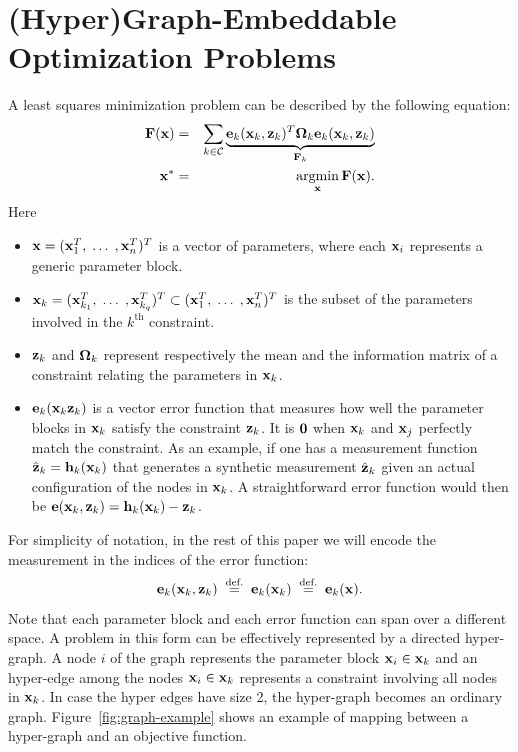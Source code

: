 \documentclass[a4paper]{article}
\begin{document}
\section{(Hyper)Graph-Embeddable Optimization Problems}
A least squares minimization problem can be described by the following equation:
\begin{eqnarray}
\mathbf{F}(\mathbf{x})&=& \sum_{k \in\mathcal{C}}
\underbrace{\mathbf{e}_k(\mathbf{x}_k, \mathbf{z}_{k})^T \mathbf{\Omega}_{k} \mathbf{e}_k(\mathbf{x}_k, \mathbf{z}_{k})}_{\mathbf{F}_{k}}
\label{eq:sumOfFactors}\\
\mathbf{x}^*&=&\mathop{\rm argmin}_{\mathbf{x}} \mathbf{F}(\mathbf{x}).
\label{eq:toMinimize}
\end{eqnarray}
Here
\begin{itemize}
  \item  $\mathbf{x}=(\mathbf{x}_1^T,\;\ldots\;,\mathbf{x}_n^T)^T$ is a vector of
    parameters, where each $\mathbf{x}_i$ represents a generic parameter block.
  \item $\mathbf{x}_k=(\mathbf{x}_{k_1}^T,\;\ldots\;,\mathbf{x}_{k_q}^T)^T \subset
    (\mathbf{x}_1^T,\;\ldots\;,\mathbf{x}_n^T)^T$ is the subset of the parameters
    involved in the $k^\mathrm{th}$ constraint.
  \item $\mathbf{z}_{k}$ and $\mathbf{\Omega}_{k}$ represent
    respectively the mean and the information matrix of a constraint
    relating the parameters in $\mathbf{x}_k$.
  \item $\mathbf{e}_k(\mathbf{x}_k \mathbf{z}_{k})$ is a vector error function
    that measures how well the parameter blocks in $\mathbf{x}_k$ satisfy the
    constraint $\mathbf{z}_{k}$. It is $\mathbf{0}$ when $\mathbf{x}_k$ and $\mathbf{x}_j$
    perfectly match the constraint.  As an example, if one has a
    measurement function $\hat {\mathbf{z}}_k = \mathbf{h}_k(\mathbf{x}_k)$ that generates a
    synthetic measurement $\hat {\mathbf{z}}_k$ given an actual configuration
    of the nodes in $\mathbf{x}_k$.  A straightforward error function would
    then be $\mathbf{e}(\mathbf{x}_k, \mathbf{z}_{k}) = \mathbf{h}_k(\mathbf{x}_k) - \mathbf{z}_k$.
\end{itemize}
For simplicity of notation, in the rest of this paper we will encode
the measurement in the indices of the error function:
\begin{equation}
\mathbf{e}_k(\mathbf{x}_k, \mathbf{z}_{k}) \; \stackrel{\text{def.}}{=} \; \mathbf{e}_{k}(\mathbf{x}_k) \; \stackrel{\text{def.}}{=} \; \mathbf{e}_{k}(\mathbf{x}).
\end{equation}
Note that each parameter block and each error
function can span over a different space.  A problem in this form can
be effectively represented by a directed hyper-graph. A node $i$ of
the graph represents the parameter block $\mathbf{x}_i \in \mathbf{x}_k$ and an
hyper-edge among the nodes $\mathbf{x}_{i} \in \mathbf{x}_k $ represents a
constraint involving all nodes in $\mathbf{x}_k$. In case the hyper edges
have size 2, the hyper-graph becomes an ordinary graph.
Figure~\ref{fig:graph-example} shows an
example of mapping between a hyper-graph and an objective function.
\end{document}
